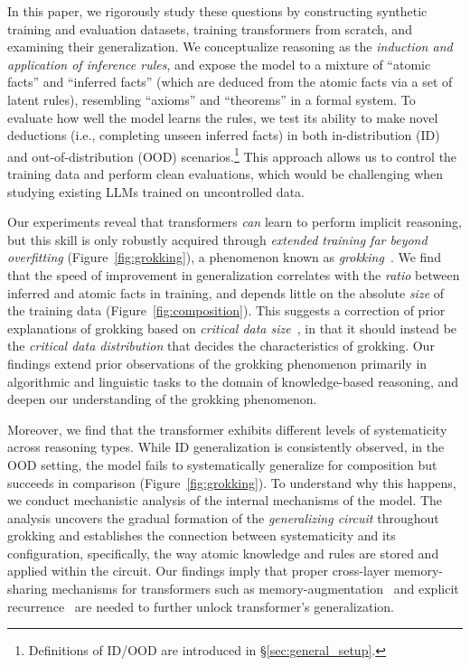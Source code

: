 In this paper, we rigorously study these questions by constructing synthetic training and evaluation datasets, training transformers from scratch, and examining their generalization. We conceptualize reasoning as the \textit{induction and application of inference rules}, and expose the model to a mixture of ``atomic facts'' and ``inferred facts'' (which are deduced from the atomic facts via a set of latent rules), resembling ``axioms'' and ``theorems'' in a formal system. To evaluate how well the model learns the rules, we test its ability to make novel deductions (i.e., completing unseen inferred facts) in both in-distribution (ID) and out-of-distribution (OOD) scenarios.\footnote{Definitions of ID/OOD are introduced in \S\ref{sec:general_setup}.} This approach allows us to control the training data and perform clean evaluations, which would be challenging when studying existing LLMs trained on uncontrolled data.

Our experiments reveal that transformers \textit{can} learn to perform implicit reasoning, but this skill is only robustly acquired through \textit{extended training far beyond overfitting} (Figure~\ref{fig:grokking}), a phenomenon known as \textit{grokking}~\citep{power2022grokking}. We find that the speed of improvement in generalization correlates with the \textit{ratio} between inferred and atomic facts in training, and depends little on the absolute \textit{size} of the training data (Figure~\ref{fig:composition}). This suggests a correction of prior explanations of grokking based on \textit{critical data size}~\citep{liu2023omnigrok, varma2023explaining, zhu2024critical, huang2024unified}, in that it should instead be the \textit{critical data distribution} that decides the characteristics of grokking. Our findings extend prior observations of the grokking phenomenon primarily in algorithmic and linguistic tasks \citep{power2022grokking, murty-etal-2023-grokking} to the domain of knowledge-based reasoning, and deepen our understanding of the grokking phenomenon.

Moreover, we find that the transformer exhibits different levels of systematicity across reasoning types. While ID generalization is consistently observed, in the OOD setting, the model fails to systematically generalize for composition but succeeds in comparison (Figure~\ref{fig:grokking}). To understand why this happens, we conduct mechanistic analysis of the internal mechanisms of the model. The analysis uncovers the gradual formation of the \textit{generalizing circuit} throughout grokking and establishes the connection between systematicity and its configuration, specifically, the way atomic knowledge and rules are stored and applied within the circuit. Our findings imply that proper cross-layer memory-sharing mechanisms for transformers such as memory-augmentation~\citep{sukhbaatar2015end, graves2016hybrid} and explicit recurrence~\citep{dehghani2018universal, hutchins2022blockrecurrent, tan-etal-2023-sparse} are needed to further unlock transformer's generalization.


